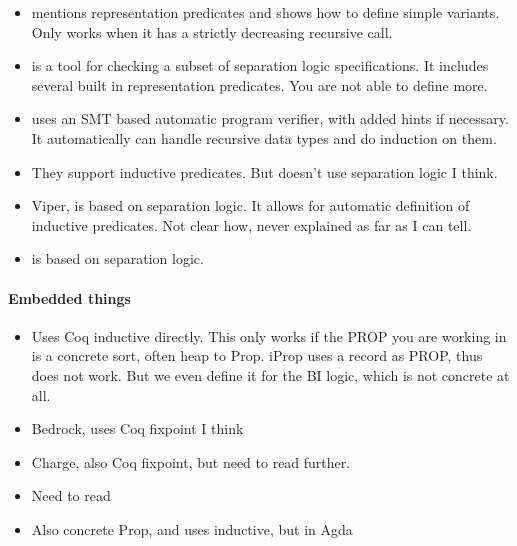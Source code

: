 \documentclass[thesis.tex]{subfiles}
\begin{document}
\begin{itemize}
    \item \cite{caoVSTFloydSeparationLogic2018} mentions representation predicates and shows how to define simple variants. Only works when it has a strictly decreasing recursive call.
    \item \cite{berdineSmallfootModularAutomatic2005} is a tool for checking a subset of separation logic specifications. It includes several built in representation predicates. You are not able to define more.
    \item \cite{leinoDafnyAutomaticProgram2010} uses an SMT based automatic program verifier, with added hints if necessary. It automatically can handle recursive data types and do induction on them.
    \item \cite{filliatreOneLogicUse2013} They support inductive predicates. But doesn't use separation logic I think.
    \item \cite{mullerViperVerificationInfrastructure2016,summersAutomatingDeductiveVerification2018} Viper, is based on separation logic. It allows for automatic definition of inductive predicates. Not clear how, never explained as far as I can tell.
    \item \cite{jacobsVeriFastPowerfulSound2011} is based on separation logic.
\end{itemize}

\paragraph{Embedded things}
\begin{itemize}
    \item \cite{appelTacticsSeparationLogic} Uses Coq inductive directly. This only works if the PROP you are working in is a concrete sort, often heap to Prop. iProp uses a record as PROP, thus does not work. But we even define it for the BI logic, which is not concrete at all.
    \item \cite{chlipalaMostlyautomatedVerificationLowlevel2011} Bedrock, uses Coq fixpoint I think
    \item \cite{bengtsonCharge2012} Charge, also Coq fixpoint, but need to read further.
    \item \cite{appelProgramLogicsCertified2014} Need to read
    \item \cite{rouvoetIntrinsicallyTypedCompilation2021} Also concrete Prop, and uses inductive, but in Agda
\end{itemize}
\end{document}
